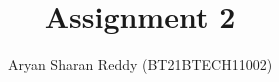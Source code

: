 \documentclass[journal,12pt,twocolumn]{IEEEtran}
\begin{document}
\let\vec\mathbf
\def\putbox#1#2#3{\makebox[0in][l]{\makebox[#1][l]{}\raisebox{\baselineskip}[0in][0in]{\raisebox{#2}[0in][0in]{#3}}}}
     \def\rightbox#1{\makebox[0in][r]{#1}}
     \def\centbox#1{\makebox[0in]{#1}}
     \def\topbox#1{\raisebox{-\baselineskip}[0in][0in]{#1}}
     \def\midbox#1{\raisebox{-0.5\baselineskip}[0in][0in]{#1}}
\title{
		Assignment 2
}
\author{ Aryan Sharan Reddy (BT21BTECH11002)%
}
\graphicspath{{figures/}}
%
%
%
% 
%
\end{document}
